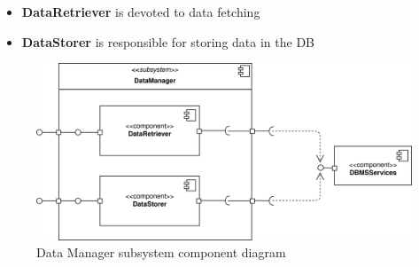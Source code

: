 \documentclass[]{article}
\begin{document}
		\begin{itemize}
		
			\item \textbf{DataRetriever} is devoted to data fetching
			\item \textbf{DataStorer} is responsible for storing data in the DB
		\end{itemize}
		
			\begin{figure}[H]
			\centering
			\includegraphics[scale=0.9]{ComponentView/DataManagerComponent.png}
			\caption{Data Manager subsystem component diagram}
			\label{fig:DataManagerDiagram}
		\end{figure}
		
	\bigskip
	\newpage
	\noindent
\end{document}
